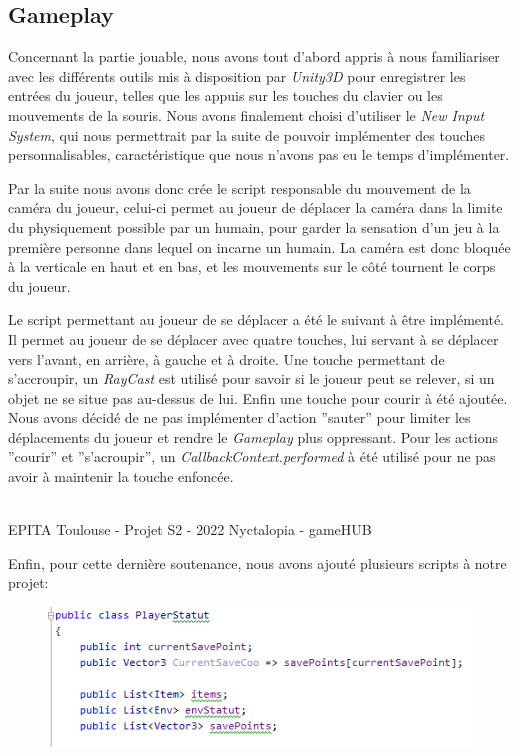 \subsection{Gameplay}
\setlength{\parindent}{5ex}
Concernant la partie jouable, nous avons tout d'abord appris à nous familiariser avec les différents outils mis à disposition par \emph{Unity3D} pour enregistrer les entrées du joueur, telles que les appuis sur les touches du clavier ou les mouvements de la souris.
Nous avons finalement choisi d'utiliser le \emph{New Input System}, qui nous permettrait par la suite de pouvoir implémenter des touches personnalisables, caractéristique que nous n'avons pas eu le temps d'implémenter.
\par
Par la suite nous avons donc crée le script responsable du mouvement de la caméra du joueur, celui-ci permet au joueur de déplacer la caméra dans la limite du physiquement possible par un humain, pour garder la sensation d'un jeu à la première personne dans lequel on incarne un humain. La caméra est donc bloquée à la verticale en haut et en bas, et les mouvements sur le côté tournent le corps du joueur.
\par
Le script permettant au joueur de se déplacer a été le suivant à être implémenté. Il permet au joueur de se déplacer avec quatre touches, lui servant à se déplacer vers l'avant, en arrière, à gauche et à droite.
Une touche permettant de s'accroupir, un \emph{RayCast} est utilisé pour savoir si le joueur peut se relever, si un objet ne se situe pas au-dessus de lui.
Enfin une touche pour courir à été ajoutée.
Nous avons décidé de ne pas implémenter d'action ''sauter'' pour limiter les déplacements du joueur et rendre le \emph{Gameplay} plus oppressant.
Pour les actions ''courir'' et ''s'acroupir'', un \emph{CallbackContext.performed} à été utilisé pour ne pas avoir à maintenir la touche enfoncée.

\vfill
\noindent\makebox[\linewidth]{\rule{.8\paperwidth}{.6pt}}\\[0.2cm]
EPITA Toulouse - Projet S2 - 2022 \hfill Nyctalopia - gameHUB
\noindent\makebox[\linewidth]{\rule{.8\paperwidth}{.6pt}}
\newpage

\par
Enfin, pour cette dernière soutenance, nous avons ajouté plusieurs scripts à notre projet:

\begin{figure}[H]
\centering
\begin{minipage}{.5\textwidth}
  \centering
  \centerline{\includegraphics[width=1.5\linewidth]{img/gameplay/playerstatut.PNG}}
  \label{fig:octobercrowfont}
\end{minipage}%
\end{figure}

